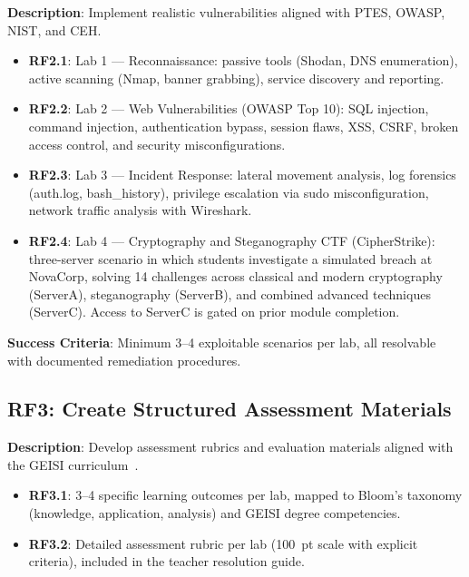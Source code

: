 \textbf{Description}: Implement realistic vulnerabilities aligned with PTES\cite{ptes},
OWASP\cite{owasp_testing_guide}, NIST\cite{nist_framework}, and CEH\cite{ceh_framework}.

\begin{itemize}
\item \textbf{RF2.1}: Lab 1 --- Reconnaissance: passive tools (Shodan, DNS enumeration),
      active scanning (Nmap\cite{nmap}, banner grabbing), service discovery and reporting.

\item \textbf{RF2.2}: Lab 2 --- Web Vulnerabilities (OWASP Top 10): SQL injection,
      command injection, authentication bypass, session flaws, XSS, CSRF,
      broken access control, and security misconfigurations.

\item \textbf{RF2.3}: Lab 3 --- Incident Response: lateral movement analysis,
      log forensics (auth.log, bash\_history), privilege escalation via sudo
      misconfiguration, network traffic analysis with Wireshark\cite{wireshark}.

\item \textbf{RF2.4}: Lab 4 --- Cryptography and Steganography CTF (CipherStrike):
      three-server scenario in which students investigate a simulated breach at NovaCorp,
      solving 14 challenges across classical and modern cryptography (ServerA), steganography
      (ServerB), and combined advanced techniques (ServerC). Access to ServerC is gated
      on prior module completion.
\end{itemize}

\textbf{Success Criteria}: Minimum 3--4 exploitable scenarios per lab, all resolvable
with documented remediation procedures.

\subsection{RF3: Create Structured Assessment Materials}

\textbf{Description}: Develop assessment rubrics and evaluation materials aligned with
the GEISI curriculum~\cite{geisi_curriculum}.

\begin{itemize}
\item \textbf{RF3.1}: 3--4 specific learning outcomes per lab, mapped to Bloom's taxonomy
      (knowledge, application, analysis) and GEISI degree competencies.

\item \textbf{RF3.2}: Detailed assessment rubric per lab (100~pt scale with explicit
      criteria), included in the teacher resolution guide.
\end{itemize}

